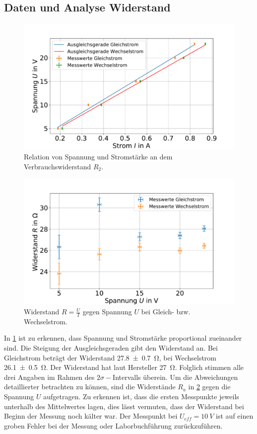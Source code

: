 \subsection{Daten und Analyse Widerstand} 



\begin{figure}
	\centering
	\includegraphics[width=0.9\linewidth]{"auswertung/Auswertung Innenwiderstand/Widerstand R2 B"}
	\caption{Relation von Spannung und Stromstärke an dem Verbrauchswiderstand $R_2$.}
	\label{fig:widerstand-r2}
\end{figure}



\begin{figure}
	\centering
	\includegraphics[width=0.9\linewidth]{"auswertung/Auswertung Innenwiderstand/WiderstandR2 A"}
	\caption{Widerstand $R=\frac{U}{I}$ gegen Spannung $U$ bei Gleich- bzw. Wechselstrom.}
	\label{fig:widerstandr2-a}
\end{figure}


In \cref{fig:widerstand-r2} ist zu erkennen, dass Spannung und Stromstärke proportional zueinander sind. Die Steigung der Ausgleichsgeraden gibt den Widerstand an. Bei Gleichstrom beträgt der Widerstand \SI{27.8+-0.7}{\ohm}, bei Wechselstrom \SI{26.1+- 0.5}{\ohm}. Der Widerstand hat laut Hersteller \SI{27}{\ohm}. Folglich stimmen alle drei Angaben im Rahmen des $2\sigma-$Intervalls überein. Um die Abweichungen detaillierter betrachten zu können, sind die Widerstände $R_a$ in \cref{fig:widerstandr2-a} gegen die Spannung $U$ aufgetragen. Zu erkennen ist, dass die ersten Messpunkte jeweils unterhalb des Mittelwertes lagen, dies lässt vermuten, dass der Widerstand bei Beginn der Messung noch kälter war. Der Messpunkt bei  $U_{eff}= \SI{10}{V}$ ist auf einen groben Fehler bei der Messung oder Laborbuchführung zurückzuführen.\\


